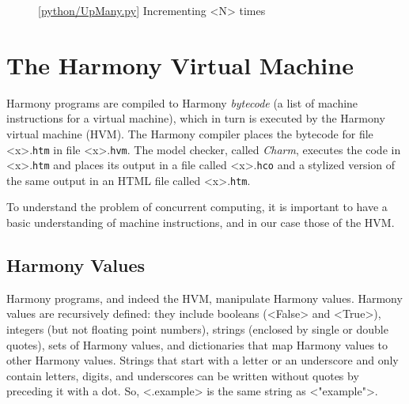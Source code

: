 \documentclass{report}
\newcommand{\harmonylink}[1]{%
[\href{https://harmony.cs.cornell.edu/#1}{\underline{#1}}]%
}
\newenvironment{code}{
\tcolorbox
}{
\endtcolorbox
}
\begin{document}
\begin{figure}
\begin{code}
\end{code}
\caption{\harmonylink{python/UpMany.py} Incrementing <{N}> times}
\label{fig:incmany}
\end{figure}

\chapter{The Harmony Virtual Machine}
\label{ch:harmonymachine}
%

Harmony programs are compiled to Harmony \emph{bytecode}
%
(a list of machine instructions for a virtual machine),
which in turn is executed by the Harmony virtual machine (HVM).
%
%
%
The Harmony compiler places the bytecode for file <{x}>.\texttt{htm} in
file <{x}>.\texttt{hvm}.
The model checker, called \emph{Charm}, executes the code in
<{x}>.\texttt{htm} and places its output in a file
called <{x}>.\texttt{hco} and a stylized version of the same output
in an HTML file called <{x}>.\texttt{htm}.

To understand the problem of concurrent computing, it
is important to have a basic understanding of machine instructions,
and in our case those of the HVM.

\section*{Harmony Values}

Harmony programs, and indeed the HVM,  manipulate Harmony values.
Harmony values are recursively defined:
they include booleans (<{False}> and <{True}>),
integers (but not floating point numbers),
strings (enclosed by single or double quotes),
sets of Harmony values, and dictionaries
%
that map Harmony values to other Harmony values.
Strings that start with a letter or an underscore and only contain
letters, digits, and underscores can be written without quotes by
preceding it with a dot.  So, <{.example}> is the same string
as <{"example"}>.
\end{document}
